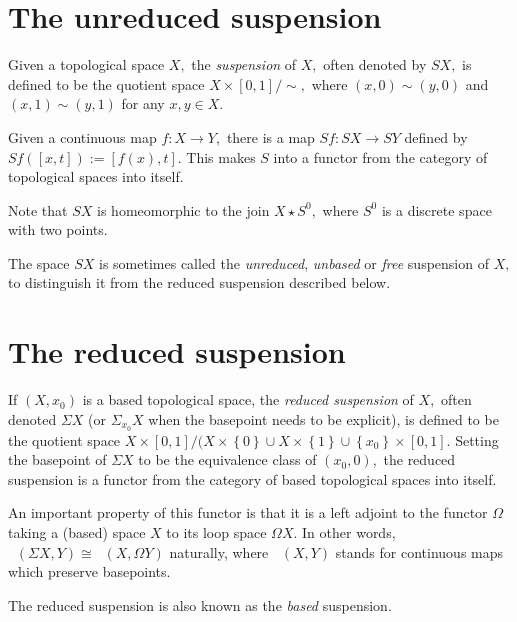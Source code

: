 \documentclass[12pt]{article}
\newcommand{\set}[1]{\left\{#1\right\}}
\newcommand{\funcsig}[2]{#1\rightarrow #2}
\newcommand{\funcdef}[3]{#1:\funcsig{#2}{#3}}
\newcommand{\bmaps}[2]{\mathop{\mathrm{Maps}_*}\left(#1,#2\right)}
\newcommand{\cross}{\times}
\newcommand{\isom}{\cong}
\newcommand{\susp}{\Sigma}
\begin{document}
\section{The unreduced suspension}

Given a topological space $X,$ the {\em suspension} of $X,$ often denoted by $SX,$ is defined to be the quotient space $X\cross[0,1]/\sim,$ where $(x,0)\sim(y,0)$ and $(x,1)\sim(y,1)$ for any $x, y\in X.$ 

Given a continuous map $\funcdef{f}{X}{Y},$ there is a map 
$\funcdef{Sf}{SX}{SY}$ defined by $Sf([x,t]):=[f(x),t].$ This makes $S$ into a functor from the category of topological spaces into itself. 

Note that $SX$ is homeomorphic to the join $X\star S^0,$ where $S^0$ is a discrete space with two points.

The space $SX$ is sometimes called the {\em unreduced}, {\em unbased} or {\em free} suspension of $X,$ to distinguish it from the reduced suspension described below.


\section{The reduced suspension}
If $(X,x_0)$ is a based topological space, the {\em reduced suspension} of $X,$ often denoted $\susp X$ (or $\susp_{x_0} X$ when the basepoint needs to be explicit), is defined to be the quotient space $X\times[0,1]/(X\cross\set{0}\cup X\cross\set{1}\cup\set{x_0}\cross[0,1].$ Setting the basepoint of $\susp X$ to be the equivalence class of $(x_0,0),$ the reduced suspension is a functor from the category of based topological spaces into itself.

An important property of this functor is that it is a left adjoint to the functor $\Omega$ taking a (based) space $X$ to its loop space $\Omega X$. In other words, $\bmaps{\susp X}{Y}\isom\bmaps{X}{\Omega Y}$ naturally, where $\bmaps{X}{Y}$ stands for continuous maps which preserve basepoints.

The reduced suspension is also known as the {\em based\/} suspension.
\end{document}
